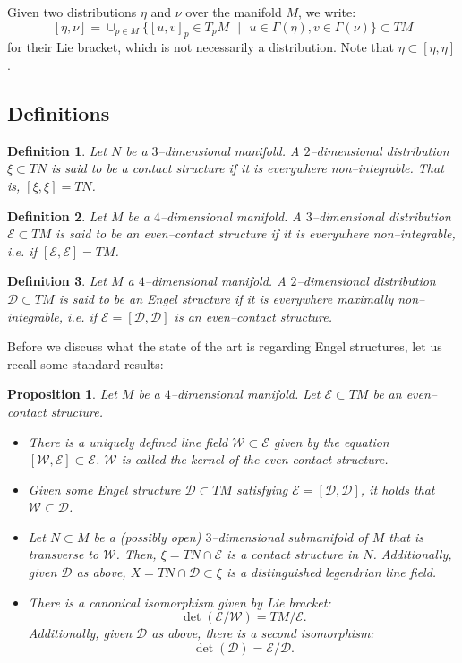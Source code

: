 \documentclass[10pt]{amsart}
\newcommand{\SE}{{\mathcal{E}}}
\newcommand{\SD}{{\mathcal{D}}}
\newcommand{\SW}{{\mathcal{W}}}
\newtheorem{proposition}{Proposition}
\newtheorem{definition}{Definition}
\theoremstyle{definition}
\begin{document}
Given two distributions $\eta$ and $\nu$ over the manifold $M$, we write:
\[ [\eta, \nu] = \cup_{p \in M} \{ [u,v]_p \in T_pM \text{ $|$ } u \in \Gamma(\eta), v \in \Gamma(\nu) \} \subset TM \]
for their Lie bracket, which is not necessarily a distribution. Note that $\eta \subset [\eta, \eta]$.



\subsection{Definitions}

\begin{definition}
Let $N$ be a $3$--dimensional manifold. A $2$--dimensional distribution $\xi \subset TN$ is said to be a \emph{contact structure} if it is everywhere non--integrable. That is, $[\xi,\xi] = TN$. 
\end{definition} 

\begin{definition}
Let $M$ be a $4$--dimensional manifold. A $3$--dimensional distribution $\SE \subset TM$ is said to be an \emph{even--contact structure} if it is everywhere non--integrable, i.e. if $[\SE,\SE] = TM$. 
\end{definition}

\begin{definition}
Let $M$ a $4$--dimensional manifold. A $2$--dimensional distribution $\SD \subset TM$ is said to be an \emph{Engel structure} if it is everywhere maximally non--integrable, i.e. if $\SE = [\SD, \SD]$ is an even--contact structure. 
\end{definition}

Before we discuss what the state of the art is regarding Engel structures, let us recall some standard results:

\begin{proposition} \label{prop:str}
Let $M$ be a $4$--dimensional manifold. Let $\SE \subset TM$ be an even--contact structure.
\begin{itemize}
\item There is a uniquely defined line field $\SW \subset \SE$ given by the equation $[\SW,\SE] \subset \SE$. $\SW$ is called the \textsl{kernel} of the even contact structure.
\item Given some Engel structure $\SD \subset TM$ satisfying $\SE = [\SD, \SD]$, it holds that $\SW \subset \SD$.
\item Let $N \subset M$ be a (possibly open) $3$--dimensional submanifold of $M$ that is transverse to $\SW$. Then, $\xi = TN \cap \SE$ is a contact structure in $N$. Additionally, given $\SD$ as above, $X = TN \cap \SD \subset \xi$ is a distinguished legendrian line field. 
\item There is a canonical isomorphism given by Lie bracket:
\begin{equation} \label{eq:C1} 
	\det(\SE/\SW) = TM/\SE.
\end{equation}
Additionally, given $\SD$ as above, there is a second isomorphism:
\begin{equation} \label{eq:C2} 
	\det(\SD) = \SE/\SD. 
\end{equation}
\end{itemize}
\end{proposition}
\end{document}

